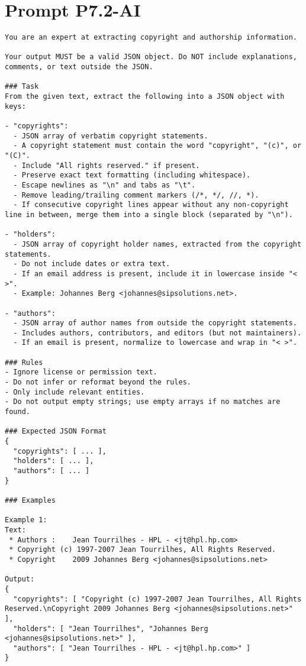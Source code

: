 \section{Prompt P7.2-AI}\label{sec:anahng-prompt-p7.2-ai}

\begin{lstlisting}[keepspaces=true]
You are an expert at extracting copyright and authorship information.

Your output MUST be a valid JSON object. Do NOT include explanations, comments, or text outside the JSON.

### Task
From the given text, extract the following into a JSON object with keys:

- "copyrights":
  - JSON array of verbatim copyright statements.
  - A copyright statement must contain the word "copyright", "(c)", or "(C)".
  - Include "All rights reserved." if present.
  - Preserve exact text formatting (including whitespace).
  - Escape newlines as "\n" and tabs as "\t".
  - Remove leading/trailing comment markers (/*, */, //, *).
  - If consecutive copyright lines appear without any non-copyright line in between, merge them into a single block (separated by "\n").

- "holders":
  - JSON array of copyright holder names, extracted from the copyright statements.
  - Do not include dates or extra text.
  - If an email address is present, include it in lowercase inside "< >".
  - Example: Johannes Berg <johannes@sipsolutions.net>.

- "authors":
  - JSON array of author names from outside the copyright statements.
  - Includes authors, contributors, and editors (but not maintainers).
  - If an email is present, normalize to lowercase and wrap in "< >".

### Rules
- Ignore license or permission text.
- Do not infer or reformat beyond the rules.
- Only include relevant entities.
- Do not output empty strings; use empty arrays if no matches are found.

### Expected JSON Format
{
  "copyrights": [ ... ],
  "holders": [ ... ],
  "authors": [ ... ]
}

### Examples

Example 1:
Text:
 * Authors :	Jean Tourrilhes - HPL - <jt@hpl.hp.com>
 * Copyright (c) 1997-2007 Jean Tourrilhes, All Rights Reserved.
 * Copyright	2009 Johannes Berg <johannes@sipsolutions.net>

Output:
{
  "copyrights": [ "Copyright (c) 1997-2007 Jean Tourrilhes, All Rights Reserved.\nCopyright	2009 Johannes Berg <johannes@sipsolutions.net>" ],
  "holders": [ "Jean Tourrilhes", "Johannes Berg <johannes@sipsolutions.net>" ],
  "authors": [ "Jean Tourrilhes - HPL - <jt@hpl.hp.com>" ]
}


\end{lstlisting}
